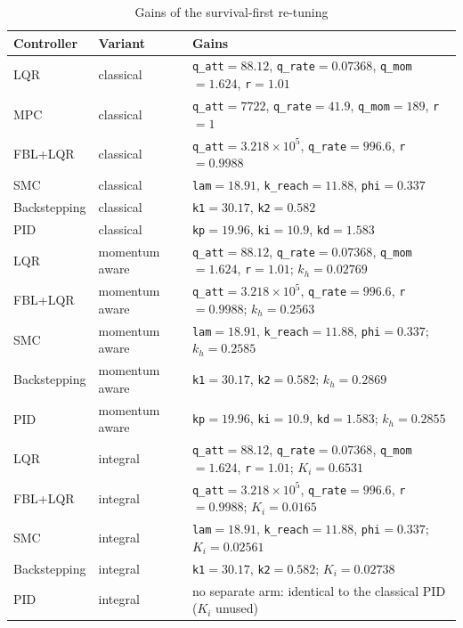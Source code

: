 \documentclass[conference]{IEEEtran}
\begin{document}
\begin{table}[h]\centering\scriptsize
\caption{Gains of the survival-first re-tuning}
\begin{tabular}{@{}llp{}@{}}
\toprule
Controller & Variant & Gains \\
\midrule
LQR & classical & \texttt{q\_att}$=88.12$, \texttt{q\_rate}$=0.07368$, \texttt{q\_mom}$=1.624$, \texttt{r}$=1.01$ \\
MPC & classical & \texttt{q\_att}$=7722$, \texttt{q\_rate}$=41.9$, \texttt{q\_mom}$=189$, \texttt{r}$=1$ \\
FBL+LQR & classical & \texttt{q\_att}$=3.218\times10^{5}$, \texttt{q\_rate}$=996.6$, \texttt{r}$=0.9988$ \\
SMC & classical & \texttt{lam}$=18.91$, \texttt{k\_reach}$=11.88$, \texttt{phi}$=0.337$ \\
Backstepping & classical & \texttt{k1}$=30.17$, \texttt{k2}$=0.582$ \\
PID & classical & \texttt{kp}$=19.96$, \texttt{ki}$=10.9$, \texttt{kd}$=1.583$ \\
LQR & momentum aware & \texttt{q\_att}$=88.12$, \texttt{q\_rate}$=0.07368$, \texttt{q\_mom}$=1.624$, \texttt{r}$=1.01$; $k_h=0.02769$ \\
FBL+LQR & momentum aware & \texttt{q\_att}$=3.218\times10^{5}$, \texttt{q\_rate}$=996.6$, \texttt{r}$=0.9988$; $k_h=0.2563$ \\
SMC & momentum aware & \texttt{lam}$=18.91$, \texttt{k\_reach}$=11.88$, \texttt{phi}$=0.337$; $k_h=0.2585$ \\
Backstepping & momentum aware & \texttt{k1}$=30.17$, \texttt{k2}$=0.582$; $k_h=0.2869$ \\
PID & momentum aware & \texttt{kp}$=19.96$, \texttt{ki}$=10.9$, \texttt{kd}$=1.583$; $k_h=0.2855$ \\
LQR & integral & \texttt{q\_att}$=88.12$, \texttt{q\_rate}$=0.07368$, \texttt{q\_mom}$=1.624$, \texttt{r}$=1.01$; $K_i=0.6531$ \\
FBL+LQR & integral & \texttt{q\_att}$=3.218\times10^{5}$, \texttt{q\_rate}$=996.6$, \texttt{r}$=0.9988$; $K_i=0.0165$ \\
SMC & integral & \texttt{lam}$=18.91$, \texttt{k\_reach}$=11.88$, \texttt{phi}$=0.337$; $K_i=0.02561$ \\
Backstepping & integral & \texttt{k1}$=30.17$, \texttt{k2}$=0.582$; $K_i=0.02738$ \\
PID & integral & no separate arm: identical to the classical PID ($K_i$ unused) \\
\bottomrule
\end{tabular}
\end{table}
\end{document}
